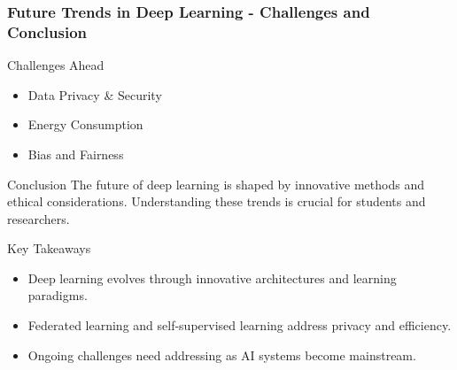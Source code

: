 \documentclass[aspectratio=169]{beamer}
\begin{document}
\begin{frame}[fragile]
    \frametitle{Future Trends in Deep Learning - Challenges and Conclusion}
    \begin{block}{Challenges Ahead}
        \begin{itemize}
            \item Data Privacy \& Security
            \item Energy Consumption
            \item Bias and Fairness
        \end{itemize}
    \end{block}

    \begin{block}{Conclusion}
        The future of deep learning is shaped by innovative methods and ethical considerations. Understanding these trends is crucial for students and researchers.
    \end{block}

    \begin{block}{Key Takeaways}
        \begin{itemize}
            \item Deep learning evolves through innovative architectures and learning paradigms.
            \item Federated learning and self-supervised learning address privacy and efficiency.
            \item Ongoing challenges need addressing as AI systems become mainstream.
        \end{itemize}
    \end{block}
\end{frame}
\end{document}
